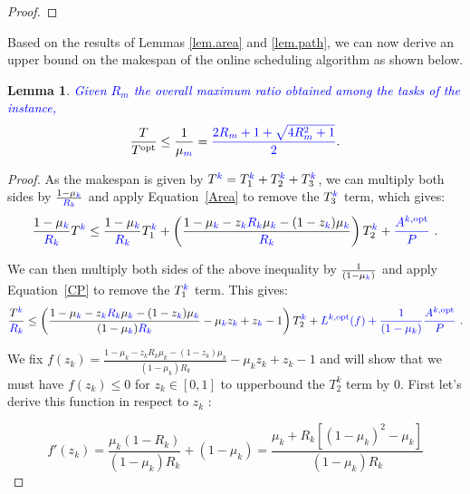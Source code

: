 \documentclass{article}
\newtheorem{lemma}{Lemma}
\newcommand\ratio{R\xspace}
\newcommand\opt{\textnormal{opt}\xspace}
\newcommand{\new}[1]{\textcolor{blue}{#1}}
\newcommand{\LP}[2][inline]{\todo[color=green!50,#1]{\sf \textbf{Lucas:} #2}
\xspace}
\begin{document}
\begin{proof}
\end{proof}

Based on the results of Lemmas \ref{lem.area} and \ref{lem.path}, we can now derive an upper bound on the makespan of the online scheduling algorithm as shown below.

\begin{lemma}\label{lem.makespan}
\new{Given $\ratio_m$ the overall maximum ratio obtained among the tasks of the instance,}
\begin{equation}\label{eq.makespan}
\frac{T}{T^{\opt}} \leq \frac{1}{\mu_{\new{m}}}=\new{ \frac{2\ratio_m+1+\sqrt{4\ratio_m^2+1}}{2}} .
\end{equation}

\end{lemma}


\begin{proof}
As the makespan is given by $T^{\new{k}}=T_1^{\new{k}}+T_2^{\new{k}}+T_3^{\new{k}}$, we can multiply both sides by $\frac{1-\mu_{\new{k}}}{\new{\ratio_k}}$ and apply
Equation~\eqref{Area} to remove the $T_3^{\new{k}}$ term, which gives:
$$\frac{1-\mu_{\new{k}}}{\new{\ratio_k}}T^{\new{k}} \leq \frac{1-\mu_{\new{k}}}{\new{\ratio_k}} T_1^{\new{k}}+\left(\frac{1-\mu_{\new{k}}-z_{\new{k}}\new{\ratio_k} \mu_{\new{k}}-(1-z_{\new{k}})\mu_{\new{k}}}{\new{\ratio_k}} \right)T_2^{\new{k}}+\new{\frac{A^{k,\opt}}{P}} \ . $$

We can then multiply both sides of the above inequality by $\frac{1}{(1-\mu_{\new{k}})}$ and apply Equation~\eqref{CP} to remove the $T_1^{\new{k}}$ term. This gives:
$$\frac{T^{\new{k}}}{\new{\ratio_k}} \leq \left(\frac{1-\mu_{\new{k}}-z_{\new{k}}\new{\ratio_k} \mu_{\new{k}}-(1-z_{\new{k}})\mu_{\new{k}}}{(1-\mu_{\new{k}})\new{\ratio_k}}-\mu_{\new{k}} z_{\new{k}}+z_{\new{k}}-1\right)T_2^{\new{k}}+\new{L^{k,\opt}(f)+\frac{1}{(1-\mu_k)}\frac{A^{k,\opt}}{P}} \ . $$


\LP{New after this}

We fix $f(z_{k})=\frac{1-\mu_{k}-z_{k}\ratio_k \mu_{k}-(1-z_{k})\mu_{k}}{(1-\mu_{k})\ratio_k}-\mu_{k} z_{k}+z_{k}-1$ and will show that we must have $f(z_{k}) \leq 0$ for $z_k \in [0,1]$ to upperbound the $T_2^k$ term by $0$. First let's derive this function in respect to $z_k$ :

$$ f'(z_k)=\frac{\mu_k(1-\ratio_k)}{(1-\mu_k)\ratio_k}+(1-\mu_k) = \frac{\mu_k + \ratio_k\left[(1-\mu_k)^2-\mu_k \right]}{(1-\mu_k)\ratio_k}$$


\end{proof}
\end{document}
